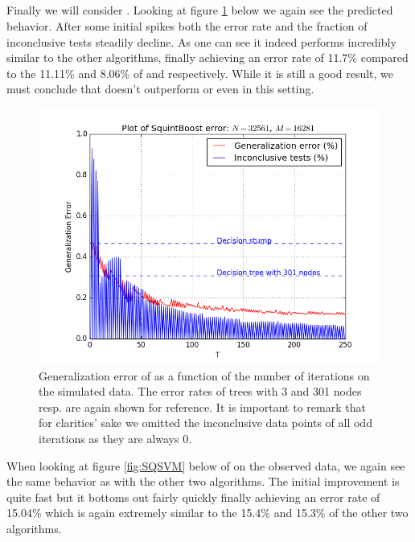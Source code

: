 \subsection{\squintB}
\label{subsec:sqPracPerf}
Finally we will consider \squintB. Looking at figure \ref{fig:SQGD} below we again see the predicted behavior. After some initial spikes both the error rate and the fraction of inconclusive tests steadily decline. As one can see it indeed performs incredibly similar to the other algorithms, finally achieving an error rate of 11.7\% compared to the 11.11\% and 8.06\% of \adaB and \NHB respectively. While it is still a good result, we must conclude that \squintB doesn't outperform \NHB or even \adaB in this setting. 
\begin{figure}[!ht]
  \centering
     \includegraphics[width=\graphWidth]{generated/SQGD.png}
  \caption{Generalization error of \squintB as a function of the number of iterations on the simulated data. The error rates of trees with 3 and 301 nodes resp. are again shown for reference. It is important to remark that for clarities' sake we omitted the inconclusive data points of all odd iterations as they are always 0.}
      \label{fig:SQGD}
\end{figure}

\par When looking at figure \ref{fig:SQSVM} below of \squintB on the observed data, we again see the same behavior as with the other two algorithms. The initial improvement is quite fast but it bottoms out fairly quickly finally achieving an error rate of 15.04\% which is again extremely similar to the 15.4\% and 15.3\% of the other two algorithms. 


